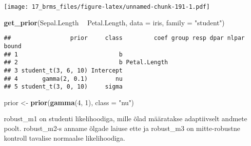 \documentclass[]{article}
\newenvironment{Shaded}{\begin{snugshade}}{\end{snugshade}}
\newcommand{\KeywordTok}[1]{\textcolor[rgb]{0.13,0.29,0.53}{\textbf{#1}}}
\newcommand{\DataTypeTok}[1]{\textcolor[rgb]{0.13,0.29,0.53}{#1}}
\newcommand{\DecValTok}[1]{\textcolor[rgb]{0.00,0.00,0.81}{#1}}
\newcommand{\StringTok}[1]{\textcolor[rgb]{0.31,0.60,0.02}{#1}}
\newcommand{\OperatorTok}[1]{\textcolor[rgb]{0.81,0.36,0.00}{\textbf{#1}}}
\newcommand{\NormalTok}[1]{#1}
\begin{document}
\texttt{[image: 17\_brms\_files/figure-latex/unnamed-chunk-191-1.pdf]}

\begin{Shaded}
\begin{Highlighting}[]
\KeywordTok{get_prior}\NormalTok{(Sepal.Length }\OperatorTok{~}\StringTok{ }\NormalTok{Petal.Length, }\DataTypeTok{data =}\NormalTok{ iris, }\DataTypeTok{family =} \StringTok{"student"}\NormalTok{)}
\end{Highlighting}
\end{Shaded}

\begin{verbatim}
##                 prior     class         coef group resp dpar nlpar bound
## 1                             b                                         
## 2                             b Petal.Length                            
## 3 student_t(3, 6, 10) Intercept                                         
## 4       gamma(2, 0.1)        nu                                         
## 5 student_t(3, 0, 10)     sigma
\end{verbatim}

\begin{Shaded}
\begin{Highlighting}[]
\NormalTok{prior <-}\StringTok{ }\KeywordTok{prior}\NormalTok{(}\KeywordTok{gamma}\NormalTok{(}\DecValTok{4}\NormalTok{, }\DecValTok{1}\NormalTok{), }\DataTypeTok{class =} \StringTok{"nu"}\NormalTok{)}
\end{Highlighting}
\end{Shaded}

robust\_m1 on studenti likelihoodiga, mille õlad määratakse adaptiivselt
andmete poolt. robust\_m2-s anname õlgade laiuse ette ja robust\_m3 on
mitte-robustne kontroll tavalise normaalse likelihoodiga.
\end{document}
